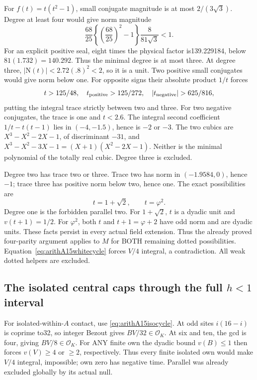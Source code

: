 \documentclass[11pt]{article}
\begin{document}
For \(f(t)=t(t^2-1)\), small conjugate magnitude is at most
\(2/(3\sqrt3)\).
Degree at least four would give norm magnitude
\[
 {\frac{68}{25}}\left\{\left({\frac{68}{25}}\right)^2-1\right\}
                         {\frac{8}{81\sqrt3}}<1 .
\]
For an explicit positive seal, eight times the physical factor
is139.229184, below \(81(1.732)=140.292\).
Thus the minimal degree is at most three.
At degree three, \(|\mathrm N(t)|<2.72(.8)^2<2\), so it is
a unit.
Two positive small conjugates would give norm below one.
For opposite signs their absolute product \(1/t\) forces
\[
 t>125/48,\quad
 t_{\rm positive}>125/272,\quad
 |t_{\rm negative}|>625/816,
\]
putting the integral trace strictly between two and three.
For two negative conjugates, the trace is one and \(t<2.6\).
The integral second coefficient
\(1/t-t(t-1)\) lies in \((-4,-1.5)\), hence is \(-2\) or \(-3\).
The two cubics are
\(X^3-X^2-2X-1\), of discriminant \(-31\), and
\(X^3-X^2-3X-1=(X+1)(X^2-2X-1)\).
Neither is the minimal polynomial of the totally real cubic.
Degree three is excluded.

Degree two has trace two or three.
Trace two has norm in \((-1.9584,0)\), hence \(-1\);
trace three has positive norm below two, hence one.
The exact possibilities are
\[
                         t=1+\sqrt2,\qquad t=\varphi^2 .
\]
Degree one is the forbidden parallel two.
For \(1+\sqrt2\), \(t\) is a dyadic unit and
\(v(t+1)=1/2\).
For \(\varphi^2\), both \(t\) and \(t+1=\varphi+2\) have
odd norm and are dyadic units.
These facts persist in every actual field extension.
Thus the already proved four-parity argument applies to \(M\)
for BOTH remaining dotted possibilities.
Equation~\eqref{eq:arithA15whitecycle} forces \(V/4\) integral,
a contradiction.
All weak dotted helpers are excluded.

\subsection[The isolated central caps through the full h<1 interval]{The isolated central caps through the full \(h<1\) interval}
\label{app:arithA15centralisolated}

For isolated-within-\(A\) contact, use
\eqref{eq:arithA15isocycle}.
At odd sites \(i(16-i)\) is coprime to32, so integer Bezout
gives \(BV/32\in\mathcal O_K\).
At six and ten, the gcd is four, giving \(BV/8\in\mathcal O_K\).
For ANY finite own the dyadic bound \(v(B)\le1\) then forces
\(v(V)\ge4\) or \(\ge2\), respectively.
Thus every finite isolated own would make \(V/4\) integral,
impossible; own zero has negative time.
Parallel was already excluded globally by its actual null.
\end{document}
